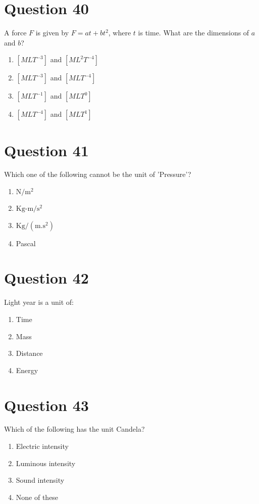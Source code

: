 \documentclass{article}
\begin{document}
\section*{Question 40}
A force \(F\) is given by \(F=a t+b t^2\), where \(t\) is time. What are the dimensions of \(a\) and \(b\)?
\begin{enumerate}[label=(\alph*)]
\item \([M L T^{-3}]\) and \([M L^2 T^{-4}]\)
\item \([M L T^{-3}]\) and \([M L T^{-4}]\)
\item \([M L T^{-1}]\) and \([M L T^0]\)
\item \([M L T^{-4}]\) and \([M L T^1]\)
\end{enumerate}
\newpage
\section*{Question 41}
Which one of the following cannot be the unit of 'Pressure'?
\begin{enumerate}[label=(\alph*)]
\item \(\mathrm{N} / \mathrm{m}^2\)
\item \(\mathrm{Kg}\)-\(\mathrm{m}/\mathrm{s}^2\)
\item \(\mathrm{Kg}/(\mathrm{m}.\mathrm{s}^2)\)
\item Pascal
\end{enumerate}
\newpage
\section*{Question 42}
Light year is a unit of:
\begin{enumerate}[label=(\alph*)]
\item Time
\item Mass
\item Distance
\item Energy
\end{enumerate}
\newpage
\section*{Question 43}
Which of the following has the unit Candela?
\begin{enumerate}[label=(\alph*)]
\item Electric intensity
\item Luminous intensity
\item Sound intensity
\item None of these
\end{enumerate}
\newpage
\end{document}
